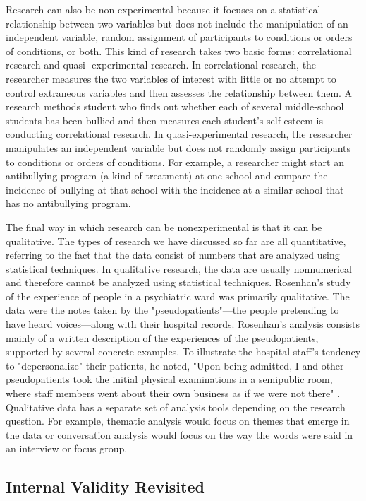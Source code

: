 Research can also be non-experimental because it focuses on a statistical relationship between two variables but does not include the manipulation of an independent variable, random assignment of participants to conditions or orders of conditions, or both. This kind of research takes two basic forms: correlational research and quasi- experimental research. In correlational research, the researcher measures the two variables of interest with little or no attempt to control extraneous variables and then assesses the relationship between them. A research methods student who finds out whether each of several middle-school students has been bullied and then measures each student's self-esteem is conducting correlational research. In quasi-experimental research, the researcher manipulates an independent variable but does not randomly assign participants to conditions or orders of conditions.
For example, a researcher might start an antibullying program (a kind of treatment) at one school and compare the incidence of bullying at that school with the incidence at a similar school that has no antibullying program.

The final way in which research can be nonexperimental is that it can be qualitative. The types of research we have discussed so far are all quantitative, referring to the fact that the data consist of numbers that are analyzed using statistical techniques. In qualitative research, the data are usually nonnumerical and therefore cannot be analyzed using statistical techniques. Rosenhan's study of the experience of people in a psychiatric ward was primarily qualitative. The data were the notes taken by the "pseudopatients"---the people pretending to have heard voices---along with their hospital records. Rosenhan's analysis consists mainly of a written description of the experiences of the pseudopatients, supported by several concrete examples. To illustrate the hospital staff's tendency to "depersonalize" their patients, he noted, "Upon being admitted, I and other pseudopatients took the initial physical examinations in a semipublic room, where staff members went about their own business as if we were not there" \citep{rosenhan_being_1973}. Qualitative data has a separate set of analysis tools depending on the research question. For example, thematic analysis would focus on themes that emerge in the data or conversation analysis would focus on the way the words were said in an interview or focus group.

\subsection{Internal Validity Revisited}

